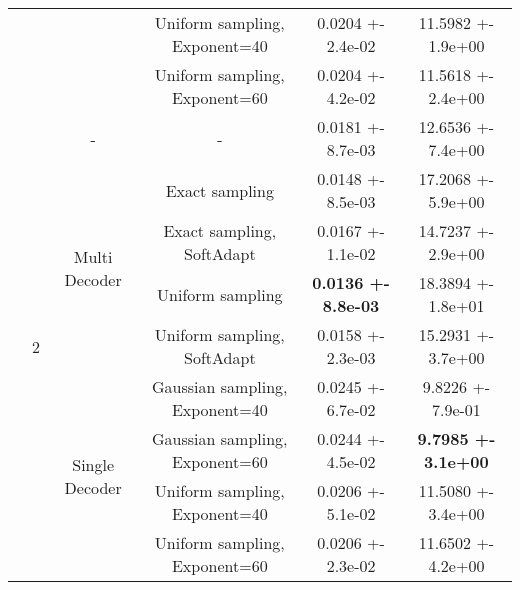 \begin{tabular}{||c|c|c|c|c|c||}
\cline{4-6}
 &  &  & Uniform sampling, Exponent=40 & 0.0204 +- 2.4e-02 & 11.5982 +- 1.9e+00 \\
\cline{4-6}
 &  &  & Uniform sampling, Exponent=60 & 0.0204 +- 4.2e-02 & 11.5618 +- 2.4e+00 \\
\cline{4-6}
\cline{3-6}
\cline{2-6}
 & \multirow{9}{*}{2} & \multirow{1}{*}{-} & - & 0.0181 +- 8.7e-03 & 12.6536 +- 7.4e+00 \\
\cline{4-6}
\cline{3-6}
 &  & \multirow{4}{*}{Multi Decoder} & Exact sampling & 0.0148 +- 8.5e-03 & 17.2068 +- 5.9e+00 \\
\cline{4-6}
 &  &  & Exact sampling, SoftAdapt & 0.0167 +- 1.1e-02 & 14.7237 +- 2.9e+00 \\
\cline{4-6}
 &  &  & Uniform sampling & \textbf{0.0136 +- 8.8e-03} & 18.3894 +- 1.8e+01 \\
\cline{4-6}
 &  &  & Uniform sampling, SoftAdapt & 0.0158 +- 2.3e-03 & 15.2931 +- 3.7e+00 \\
\cline{4-6}
\cline{3-6}
 &  & \multirow{4}{*}{Single Decoder} & Gaussian sampling, Exponent=40 & 0.0245 +- 6.7e-02 & 9.8226 +- 7.9e-01 \\
\cline{4-6}
 &  &  & Gaussian sampling, Exponent=60 & 0.0244 +- 4.5e-02 & \textbf{9.7985 +- 3.1e+00} \\
\cline{4-6}
 &  &  & Uniform sampling, Exponent=40 & 0.0206 +- 5.1e-02 & 11.5080 +- 3.4e+00 \\
\cline{4-6}
 &  &  & Uniform sampling, Exponent=60 & 0.0206 +- 2.3e-02 & 11.6502 +- 4.2e+00 \\
\cline{4-6}
\cline{3-6}
\cline{2-6}
\hline
\hline
\end{tabular}

